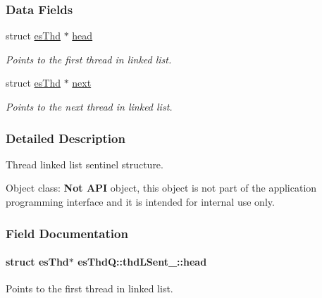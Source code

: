 \subsubsection*{Data Fields}
\begin{DoxyCompactItemize}
\item 
struct \hyperlink{structesThd}{es\-Thd} $\ast$ \hyperlink{structesThdQ_1_1thdLSent___a88776574b11b8c0b27f97f9ef9a48a46}{head}
\begin{DoxyCompactList}\small\item\em Points to the first thread in linked list. \end{DoxyCompactList}\item 
struct \hyperlink{structesThd}{es\-Thd} $\ast$ \hyperlink{structesThdQ_1_1thdLSent___a0597468d0cfc6ac195d330d8ec7dde13}{next}
\begin{DoxyCompactList}\small\item\em Points to the next thread in linked list. \end{DoxyCompactList}\end{DoxyCompactItemize}


\subsubsection{Detailed Description}
Thread linked list sentinel structure. 

\begin{DoxyParagraph}{Object class\-:}
{\bfseries Not A\-P\-I} object, this object is not part of the application programming interface and it is intended for internal use only. 
\end{DoxyParagraph}


\subsubsection{Field Documentation}
\hypertarget{structesThdQ_1_1thdLSent___a88776574b11b8c0b27f97f9ef9a48a46}{
\paragraph[{head}]{\setlength{\rightskip}{0pt plus 5cm}struct {\bf es\-Thd}$\ast$ es\-Thd\-Q\-::thd\-L\-Sent\-\_\-\-::head}}\label{structesThdQ_1_1thdLSent___a88776574b11b8c0b27f97f9ef9a48a46}


Points to the first thread in linked list. 

